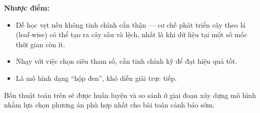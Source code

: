 \documentclass[a4paper]{article}
\begin{document}
\textbf{Nhược điểm:}
\begin{itemize}[leftmargin=*]
  \item Dễ học vẹt nếu không tinh chỉnh cẩn thận --- cơ chế phát triển cây theo
        lá (leaf-wise) có thể tạo ra cây sâu và lệch, nhất là khi dữ liệu tại
        một số mốc thời gian còn ít.
  \item Nhạy với việc chọn siêu tham số, cần tinh chỉnh kỹ để đạt hiệu quả tốt.
  \item Là mô hình dạng ``hộp đen'', khó diễn giải trực tiếp.
\end{itemize}

Bốn thuật toán trên sẽ được huấn luyện và so sánh ở giai đoạn xây dựng mô hình
nhằm lựa chọn phương án phù hợp nhất cho bài toán cảnh báo sớm.
\end{document}

